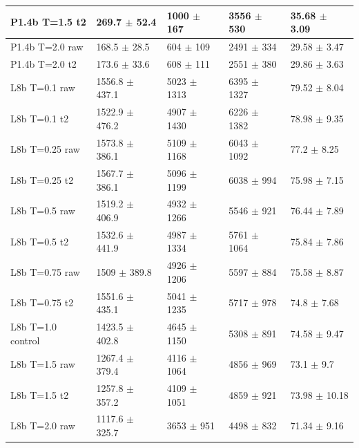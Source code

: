 \begin{tabular}{lllll}
 P1.4b T=1.5 t2       & 269.7 {\small $\pm$ 52.4}   & 1000 {\small $\pm$ 167}  & 3556 {\small $\pm$ 530}   & 35.68 {\small $\pm$ 3.09}  \\
 \midrule
 P1.4b T=2.0 raw      & 168.5 {\small $\pm$ 28.5}   & 604 {\small $\pm$ 109}   & 2491 {\small $\pm$ 334}   & 29.58 {\small $\pm$ 3.47}  \\
 P1.4b T=2.0 t2       & 173.6 {\small $\pm$ 33.6}   & 608 {\small $\pm$ 111}   & 2551 {\small $\pm$ 380}   & 29.86 {\small $\pm$ 3.63}  \\
 \midrule
 L8b T=0.1 raw        & 1556.8 {\small $\pm$ 437.1} & 5023 {\small $\pm$ 1313} & 6395 {\small $\pm$ 1327}  & 79.52 {\small $\pm$ 8.04}  \\
 L8b T=0.1 t2         & 1522.9 {\small $\pm$ 476.2} & 4907 {\small $\pm$ 1430} & 6226 {\small $\pm$ 1382}  & 78.98 {\small $\pm$ 9.35}  \\
 \midrule
 L8b T=0.25 raw       & 1573.8 {\small $\pm$ 386.1} & 5109 {\small $\pm$ 1168} & 6043 {\small $\pm$ 1092}  & 77.2 {\small $\pm$ 8.25}   \\
 L8b T=0.25 t2        & 1567.7 {\small $\pm$ 386.1} & 5096 {\small $\pm$ 1199} & 6038 {\small $\pm$ 994}   & 75.98 {\small $\pm$ 7.15}  \\
 \midrule
 L8b T=0.5 raw        & 1519.2 {\small $\pm$ 406.9} & 4932 {\small $\pm$ 1266} & 5546 {\small $\pm$ 921}   & 76.44 {\small $\pm$ 7.89}  \\
 L8b T=0.5 t2         & 1532.6 {\small $\pm$ 441.9} & 4987 {\small $\pm$ 1334} & 5761 {\small $\pm$ 1064}  & 75.84 {\small $\pm$ 7.86}  \\
 \midrule
 L8b T=0.75 raw       & 1509 {\small $\pm$ 389.8}   & 4926 {\small $\pm$ 1206} & 5597 {\small $\pm$ 884}   & 75.58 {\small $\pm$ 8.87}  \\
 L8b T=0.75 t2        & 1551.6 {\small $\pm$ 435.1} & 5041 {\small $\pm$ 1235} & 5717 {\small $\pm$ 978}   & 74.8 {\small $\pm$ 7.68}   \\
 \midrule
 L8b T=1.0 control    & 1423.5 {\small $\pm$ 402.8} & 4645 {\small $\pm$ 1150} & 5308 {\small $\pm$ 891}   & 74.58 {\small $\pm$ 9.47}  \\
 \midrule
 L8b T=1.5 raw        & 1267.4 {\small $\pm$ 379.4} & 4116 {\small $\pm$ 1064} & 4856 {\small $\pm$ 969}   & 73.1 {\small $\pm$ 9.7}    \\
 L8b T=1.5 t2         & 1257.8 {\small $\pm$ 357.2} & 4109 {\small $\pm$ 1051} & 4859 {\small $\pm$ 921}   & 73.98 {\small $\pm$ 10.18} \\
 \midrule
 L8b T=2.0 raw        & 1117.6 {\small $\pm$ 325.7} & 3653 {\small $\pm$ 951}  & 4498 {\small $\pm$ 832}   & 71.34 {\small $\pm$ 9.16}  \\

\end{tabular}
